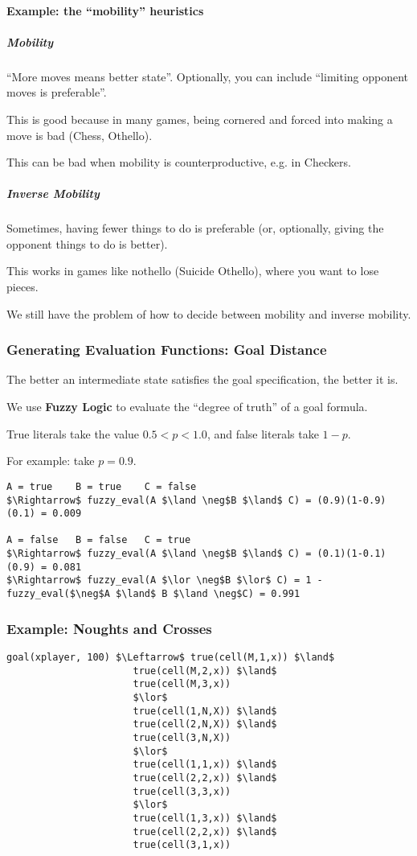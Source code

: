 \paragraph{Example: the ``mobility'' heuristics}
\subparagraph{Mobility}
``More moves means better state''. Optionally, you can include ``limiting
opponent moves is preferable''.

This is good because in many games, being cornered and forced into making a
move is bad (Chess, Othello).

This can be bad when mobility is counterproductive, e.g. in Checkers.

\subparagraph{Inverse Mobility} Sometimes, having fewer things to do is
preferable (or, optionally, giving the opponent things to do is better).

This works in games like nothello (Suicide Othello), where you want to lose
pieces.

We still have the problem of how to decide between mobility and inverse
mobility.

\subsubsection{Generating Evaluation Functions: Goal Distance}
The better an intermediate state satisfies the goal specification, the better
it is.

We use \textbf{Fuzzy Logic} to evaluate the ``degree of truth'' of a goal
formula.

True literals take the value $0.5 < p < 1.0$, and false literals take $1-p$.

For example: take $p = 0.9$.
\begin{lstlisting}
A = true    B = true    C = false
$\Rightarrow$ fuzzy_eval(A $\land \neg$B $\land$ C) = (0.9)(1-0.9)(0.1) = 0.009

A = false   B = false   C = true
$\Rightarrow$ fuzzy_eval(A $\land \neg$B $\land$ C) = (0.1)(1-0.1)(0.9) = 0.081
$\Rightarrow$ fuzzy_eval(A $\lor \neg$B $\lor$ C) = 1 - fuzzy_eval($\neg$A $\land$ B $\land \neg$C) = 0.991
\end{lstlisting}

\subsubsection{Example: Noughts and Crosses}
\begin{lstlisting}
goal(xplayer, 100) $\Leftarrow$ true(cell(M,1,x)) $\land$
                      true(cell(M,2,x)) $\land$
                      true(cell(M,3,x))
                      $\lor$
                      true(cell(1,N,X)) $\land$
                      true(cell(2,N,X)) $\land$
                      true(cell(3,N,X))
                      $\lor$
                      true(cell(1,1,x)) $\land$
                      true(cell(2,2,x)) $\land$
                      true(cell(3,3,x))
                      $\lor$
                      true(cell(1,3,x)) $\land$
                      true(cell(2,2,x)) $\land$
                      true(cell(3,1,x))
\end{lstlisting}


